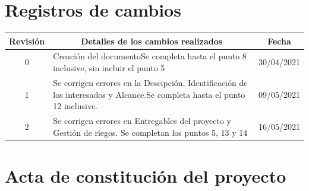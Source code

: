\documentclass[
11pt, %
codirector, %
]{charter}
\begin{document}
\maketitle
\thispagestyle{empty}
\pagebreak


\thispagestyle{empty}
{\setlength{\parskip}{0pt}
\tableofcontents{}
}
\pagebreak


\section{Registros de cambios}
\label{sec:registro}


\begin{table}[ht]
\label{tab:registro}
\centering
\begin{tabularx}{\linewidth}{@{}|c|X|c|@{}}
\hline
\rowcolor[HTML]{C0C0C0} 
Revisión & \multicolumn{1}{c|}{\cellcolor[HTML]{C0C0C0}Detalles de los cambios realizados} & Fecha      \\ \hline
0      & Creación del documento\newline Se completa hasta el punto 8 inclusive, sin incluir el punto 5 &30/04/2021 \\ \hline
1      & Se corrigen errores en la Descipción, Identificación de los interesados y Alcance.\newline Se completa hasta el punto 12 inclusive.                  & 09/05/2021 \\ \hline
2      & Se corrigen errores en Entregables del proyecto y Gestión de riegos. \newline
Se completan los puntos 5, 13 y 14					& 16/05/2021 \\ \hline
\end{tabularx}
\end{table}

\pagebreak



\section{Acta de constitución del proyecto}
\label{sec:acta}
\end{document}
